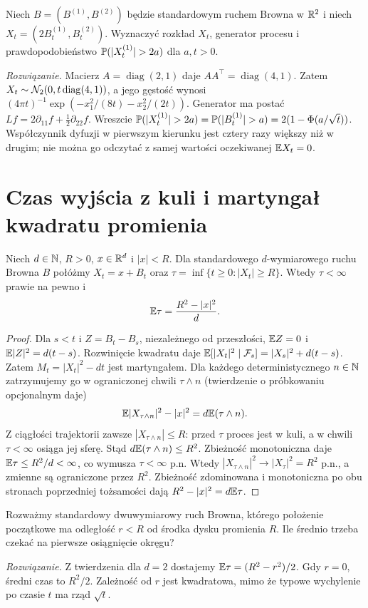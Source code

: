 \begin{zadanie}
Niech $B=(B^{(1)},B^{(2)})$ będzie standardowym ruchem Browna
w $\mathbb{R}^2$ i niech $X_t=(2B_t^{(1)},B_t^{(2)})$.
Wyznaczyć rozkład $X_t$, generator procesu i prawdopodobieństwo
$\Prob(|X_t^{(1)}|>2a)$ dla $a,t>0$.

\emph{Rozwiązanie.} Macierz $A=\operatorname{diag}(2,1)$ daje
$AA^\top=\operatorname{diag}(4,1)$. Zatem
$X_t\sim\mathcal{N}_2(0,t\operatorname{diag}(4,1))$,
a jego gęstość wynosi
$ (4\pi t)^{-1}\exp(-x_1^2/(8t)-x_2^2/(2t))$.
Generator ma postać $Lf=2\partial_{11}f+\tfrac12\partial_{22}f$.
Wreszcie
$\Prob(|X_t^{(1)}|>2a)=\Prob(|B_t^{(1)}|>a)
=2(1-\Phi(a/\sqrt t))$.
Współczynnik dyfuzji w pierwszym kierunku jest cztery razy
większy niż w drugim; nie można go odczytać z samej
wartości oczekiwanej $\mathbb{E} X_t=0$.
\end{zadanie}

\section{Czas wyjścia z kuli i martyngał kwadratu promienia}
\begin{twierdzenie}
Niech $d\in\mathbb{N}$, $R>0$, $x\in\mathbb{R}^d$ i $|x|<R$.
Dla standardowego $d$-wymiarowego ruchu Browna $B$ połóżmy
$X_t=x+B_t$ oraz $\tau=\inf\{t\ge0:|X_t|\ge R\}$.
Wtedy $\tau<\infty$ prawie na pewno i
\[
\mathbb{E}\tau=\frac{R^2-|x|^2}{d}.
\]
\end{twierdzenie}
\begin{proof}
Dla $s<t$ i $Z=B_t-B_s$, niezależnego od przeszłości,
$\mathbb{E} Z=0$ i $\mathbb{E}|Z|^2=d(t-s)$. Rozwinięcie kwadratu daje
$\mathbb{E}[|X_t|^2\mid\mathcal{F}_s]=|X_s|^2+d(t-s)$.
Zatem $M_t=|X_t|^2-dt$ jest martyngałem.
Dla każdego deterministycznego $n\in\mathbb{N}$ zatrzymujemy go
w ograniczonej chwili $\tau\wedge n$ (twierdzenie o
próbkowaniu opcjonalnym daje)
\[
\mathbb{E}|X_{\tau\wedge n}|^2-|x|^2=d\mathbb{E}(\tau\wedge n).
\]
Z ciągłości trajektorii zawsze $|X_{\tau\wedge n}|\le R$:
przed $\tau$ proces jest w kuli, a w chwili $\tau<\infty$
osiąga jej sferę. Stąd $d\mathbb{E}(\tau\wedge n)\le R^2$.
Zbieżność monotoniczna daje $\mathbb{E}\tau\le R^2/d<\infty$,
co wymusza $\tau<\infty$ p.n. Wtedy
$|X_{\tau\wedge n}|^2\to|X_\tau|^2=R^2$ p.n., a
zmienne są ograniczone przez $R^2$. Zbieżność zdominowana
i monotoniczna po obu stronach poprzedniej tożsamości dają
$R^2-|x|^2=d\mathbb{E}\tau$.
\end{proof}

\begin{zadanie}
Rozważmy standardowy dwuwymiarowy ruch Browna, którego
położenie początkowe ma odległość $r<R$ od środka dysku
promienia $R$. Ile średnio trzeba czekać na pierwsze osiągnięcie
okręgu?

\emph{Rozwiązanie.} Z twierdzenia dla $d=2$ dostajemy
$\mathbb{E}\tau=(R^2-r^2)/2$. Gdy $r=0$, średni czas to $R^2/2$.
Zależność od $r$ jest kwadratowa, mimo że typowe wychylenie
po czasie $t$ ma rząd $\sqrt t$.
\end{zadanie}

